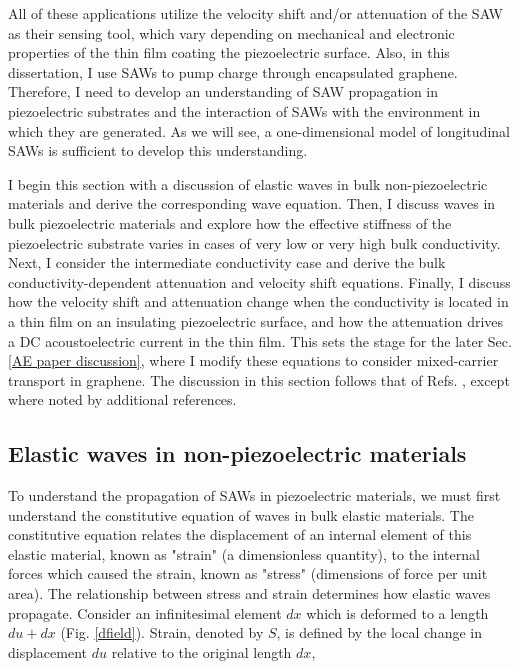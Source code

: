 \documentclass[double,12pt,1in]{beavtex}
\begin{document}
All of these applications utilize the velocity shift and/or attenuation of the SAW as their sensing tool, which vary depending on mechanical and electronic properties of the thin film coating the piezoelectric surface. Also, in this dissertation, I use SAWs to pump charge through encapsulated graphene. Therefore, I need to develop an understanding of SAW propagation in piezoelectric substrates and the interaction of SAWs with the environment in which they are generated. As we will see, a one-dimensional model of longitudinal SAWs is sufficient to develop this understanding. 

I begin this section with a discussion of elastic waves in bulk non-piezoelectric materials and derive the corresponding wave equation. Then, I discuss waves in bulk piezoelectric materials and explore how the effective stiffness of the piezoelectric substrate varies in cases of very low or very high bulk conductivity. Next, I consider the intermediate conductivity case and derive the bulk conductivity-dependent attenuation and velocity shift equations. Finally, I discuss how the velocity shift and attenuation change when the conductivity is located in a thin film on an insulating piezoelectric surface, and how the attenuation drives a DC acoustoelectric current in the thin film. This sets the stage for the later Sec. \ref{AE paper discussion}, where I modify these equations to consider mixed-carrier transport in graphene. The discussion in this section follows that of Refs. \cite{weinreich_acoustodynamic_1956, hutson_elastic_1962, wixforth_surface_1989}, except where noted by additional references.

\subsection{Elastic waves in non-piezoelectric materials}
To understand the propagation of SAWs in piezoelectric materials, we must first understand the constitutive equation of waves in bulk elastic materials. The constitutive equation relates the displacement of an internal element of this elastic material, known as "strain" (a dimensionless quantity), to the internal forces which caused the strain, known as "stress" (dimensions of force per unit area). The relationship between stress and strain determines how elastic waves propagate. Consider an infinitesimal element $dx$ which is deformed to a length $du + dx$ (Fig. \ref{dfield}). Strain, denoted by $S$, is defined by the local change in displacement $du$ relative to the original length $dx$, 
\end{document}
